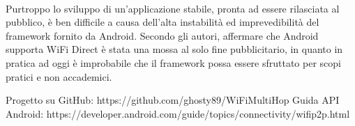 \documentclass{llncs}
\begin{document}
\paragraph{} Purtroppo lo sviluppo di un'applicazione stabile, pronta ad essere rilasciata al pubblico, è ben difficile a causa dell'alta instabilità ed imprevedibilità del framework fornito da Android. Secondo gli autori, affermare che Android supporta WiFi Direct è stata una mossa al solo fine pubblicitario, in quanto in pratica ad oggi è improbabile che il framework possa essere sfruttato per scopi pratici e non accademici.


\begin{thebibliography}{}
	 Progetto su GitHub: https://github.com/ghosty89/WiFiMultiHop
	 Guida API Android: https://developer.android.com/guide/topics/connectivity/wifip2p.html
\end{thebibliography}
\end{document}
